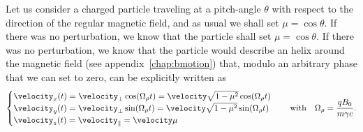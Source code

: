 Let us consider a charged particle traveling at a pitch-angle $\theta$ with respect
to the direction of the regular magnetic field, and as usual we shall set
$\mu = \cos\theta$. If there was no perturbation, we know that the particle
shall set $\mu = \cos\theta$. If there was no perturbation, we know that the particle
would describe an helix around the magnetic field (see appendix~\ref{chap:bmotion})
that, modulo an arbitrary phase that we can set to zero, can be explicitly written as
\begin{align*}
  \begin{cases}
  \velocity_x(t) = \velocity_\perp \cos(\Omega_\gyrorad t) =
  \velocity \sqrt{1 - \mu^2} \cos(\Omega_\gyrorad t)\\
  \velocity_y(t) = \velocity_\perp \sin(\Omega_\gyrorad t) =
  \velocity \sqrt{1 - \mu^2} \sin(\Omega_\gyrorad t) \\
  \velocity_z(t) = \velocity_\parallel  = \velocity\mu
  \end{cases}
  \quad\text{with}\quad
  \Omega_\gyrorad = \frac{qB_0}{m \gamma c}.
\end{align*}

